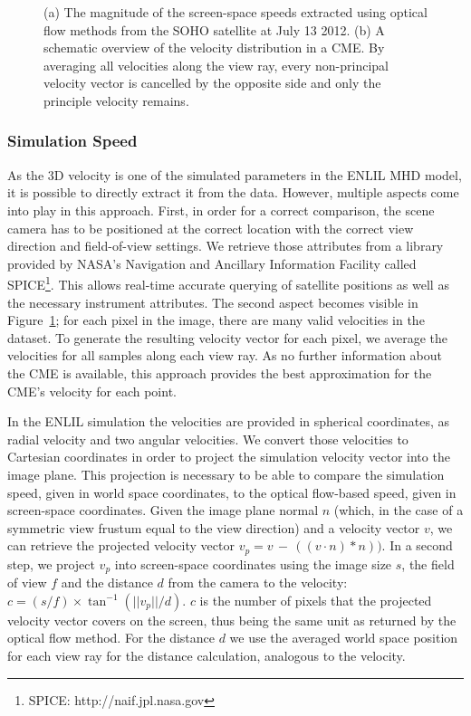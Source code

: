 \documentclass[journal]{vgtc}                %
\begin{document}
\begin{figure}
{  \label{fig:simulationvelocitygathering}
}
\caption{(a) The magnitude of the screen-space speeds extracted using optical flow methods from the SOHO satellite at July 13 2012. (b) A schematic overview of the velocity distribution in a CME. By averaging all velocities along the view ray, every non-principal velocity vector is cancelled by the opposite side and only the principle velocity remains.}
\end{figure}

\subsubsection{Simulation Speed} \label{sec:simulationvelocity}
As the 3D velocity is one of the simulated parameters in the ENLIL MHD model, it is possible to directly extract it from the data. However, multiple aspects come into play in this approach. First, in order for a correct comparison, the scene camera has to be positioned at the correct location with the correct view direction and field-of-view settings. We retrieve those attributes from a library provided by NASA's Navigation and Ancillary Information Facility called SPICE\footnote{SPICE: http://naif.jpl.nasa.gov}. This allows real-time accurate querying of satellite positions as well as the necessary instrument attributes. The second aspect becomes visible in Figure~\ref{fig:simulationvelocitygathering}; for each pixel in the image, there are many valid velocities in the dataset. To generate the resulting velocity vector for each pixel, we average the velocities for all samples along each view ray. As no further information about the CME is available, this approach provides the best approximation for the CME's velocity for each point.

In the ENLIL simulation the velocities are provided in spherical coordinates, as radial velocity and two angular velocities. We convert those velocities to Cartesian coordinates in order to project the simulation velocity vector into the image plane. This projection is necessary to be able to compare the simulation speed, given in world space coordinates, to the optical flow-based speed, given in screen-space coordinates. Given the image plane normal $n$ (which, in the case of a symmetric view frustum equal to the view direction) and a velocity vector $v$, we can retrieve the projected velocity vector $v_p = v\,-\,\left(\left(v \cdot n \right) * n \right))$. In a second step, we project $v_p$ into screen-space coordinates using the image size $s$, the field of view $f$ and the distance $d$ from the camera to the velocity: $ c = \left(s / f \right) \times \tan^{-1}\left( ||v_p|| / d \right)$. $c$ is the number of pixels that the projected velocity vector covers on the screen, thus being the same unit as returned by the optical flow method. For the distance $d$ we use the averaged world space position for each view ray for the distance calculation, analogous to the velocity. 
\end{document}
